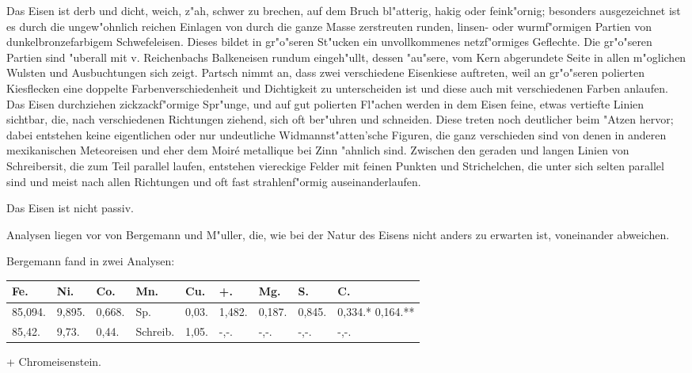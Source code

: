 \documentclass[a4paper, 11pt, oneside]{article}
\begin{document}
Das Eisen ist derb und dicht, weich, z"ah, schwer zu brechen, auf dem Bruch bl"atterig, hakig oder feink"ornig; besonders ausgezeichnet ist es durch die ungew"ohnlich reichen Einlagen von durch die ganze Masse zerstreuten runden, linsen- oder wurmf"ormigen Partien von dunkelbronzefarbigem Schwefeleisen. Dieses bildet in gr"o"seren St"ucken ein unvollkommenes netzf"ormiges Geflechte. Die gr"o"seren Partien sind "uberall mit v. Reichenbachs Balkeneisen rundum eingeh"ullt, dessen "au"sere, vom Kern abgerundete Seite in allen m"oglichen Wulsten und Ausbuchtungen sich zeigt. Partsch nimmt an, dass zwei verschiedene Eisenkiese auftreten, weil an gr"o"seren polierten Kiesflecken eine doppelte Farbenverschiedenheit und Dichtigkeit zu unterscheiden ist und diese auch mit verschiedenen Farben anlaufen. Das Eisen durchziehen zickzackf"ormige Spr"unge, und auf gut polierten Fl"achen werden in dem Eisen feine, etwas vertiefte Linien sichtbar, die, nach verschiedenen Richtungen ziehend, sich oft ber"uhren und schneiden. Diese treten noch deutlicher beim "Atzen hervor; dabei entstehen keine eigentlichen oder nur undeutliche Widmannst"atten'sche Figuren, die ganz verschieden sind von denen in anderen mexikanischen Meteoreisen und eher dem Moiré metallique bei Zinn "ahnlich sind. Zwischen den geraden und langen Linien von Schreibersit, die zum Teil parallel laufen, entstehen viereckige Felder mit feinen Punkten und Strichelchen, die unter sich selten parallel sind und meist nach allen Richtungen und oft fast strahlenf"ormig auseinanderlaufen.

Das Eisen ist nicht passiv.

Analysen liegen vor von Bergemann und M"uller, die, wie bei der Natur des Eisens nicht anders zu erwarten ist, voneinander abweichen.

Bergemann fand in zwei Analysen:
\begin{table}[H]
    \centering
    \footnotesize
    \begin{tabular}{l l l p{7mm} l l l l l}
        Fe. & Ni. & Co. & Mn. & Cu. & +. & Mg. & S. & C. \\ \hline
        85,094. & 9,895. & 0,668. & Sp. & 0,03. & 1,482. & 0,187. & 0,845. & 0,334.* 0,164.** \\
        85,42. & 9,73. & 0,44. & Schreib. & 1,05. & -,-. & -,-. & -,-. & -,-. \\
    \end{tabular}
\end{table}

+ Chromeisenstein.
\end{document}
